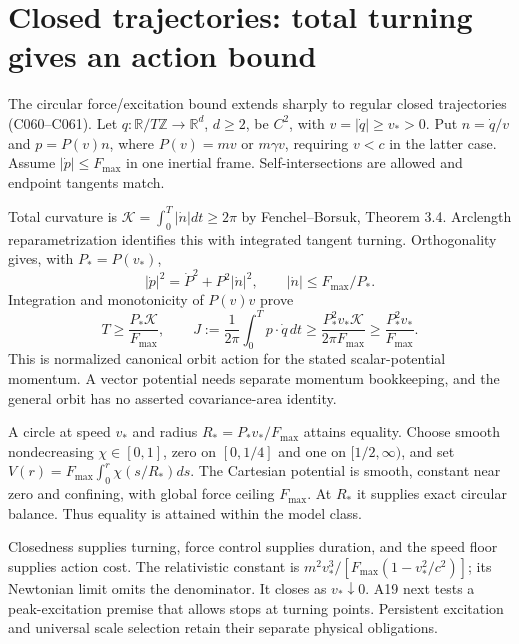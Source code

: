 \documentclass[11pt,a4paper]{article}
\begin{document}
\section{Closed trajectories: total turning gives an action bound}
The circular force/excitation bound extends sharply to regular closed
trajectories (C060--C061). Let $q:\mathbb R/T\mathbb Z\to\mathbb R^d$,
$d\ge2$, be $C^2$, with $v=|\dot q|\ge v_*>0$. Put $n=\dot q/v$ and
$p=P(v)n$, where $P(v)=mv$ or $m\gamma v$, requiring $v<c$ in the latter
case. Assume $|\dot p|\le F_{\max}$ in one inertial frame. Self-intersections
are allowed and endpoint tangents match.

Total curvature is $\mathcal K=\int_0^T|\dot n|dt\ge2\pi$ by
Fenchel--Borsuk\cite{Milnor1950TotalCurvature}, Theorem 3.4. Arclength
reparametrization identifies this with integrated tangent turning.
Orthogonality gives, with $P_*=P(v_*)$,
\[
 |\dot p|^2=\dot P^2+P^2|\dot n|^2,\qquad
 |\dot n|\le F_{\max}/P_*.
\]
Integration and monotonicity of $P(v)v$ prove
\[
 T\ge\frac{P_*\mathcal K}{F_{\max}},\qquad
 J:=\frac1{2\pi}\int_0^T p\cdot\dot q\,dt
 \ge\frac{P_*^2v_*\mathcal K}{2\pi F_{\max}}
 \ge\frac{P_*^2v_*}{F_{\max}}.
\]
This is normalized canonical orbit action for the stated scalar-potential
momentum. A vector potential needs separate momentum bookkeeping, and the
general orbit has no asserted covariance-area identity.

A circle at speed $v_*$ and radius $R_*=P_*v_*/F_{\max}$ attains equality.
Choose smooth nondecreasing $\chi\in[0,1]$, zero on $[0,1/4]$ and one on
$[1/2,\infty)$, and set $V(r)=F_{\max}\int_0^r\chi(s/R_*)ds$.
The Cartesian potential is smooth, constant near zero and confining, with
global force ceiling $F_{\max}$. At $R_*$ it supplies exact circular balance.
Thus equality is attained within the model class.

Closedness supplies turning, force control supplies duration, and the speed
floor supplies action cost. The relativistic constant is
$m^2v_*^3/[F_{\max}(1-v_*^2/c^2)]$; its Newtonian limit omits the denominator.
It closes as $v_*\downarrow0$. A19 next tests a peak-excitation premise that
allows stops at turning points. Persistent excitation and universal scale
selection retain their separate physical obligations.
\end{document}
